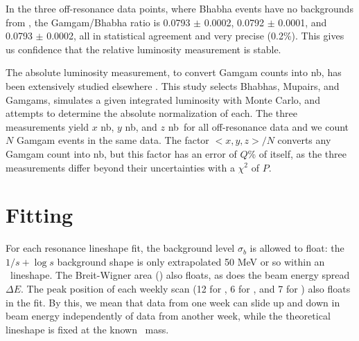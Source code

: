 \documentclass[aps,prd,preprint,superscriptaddress,tightenlines,nofootinbib,floatfix]{revtex4}
\begin{document}
In the three off-resonance data points, where Bhabha events have no
backgrounds from \ups, the Gamgam/Bhabha ratio is 0.0793 $\pm$ 0.0002,
0.0792 $\pm$ 0.0001, and 0.0793 $\pm$ 0.0002, all in statistical
agreement and very precise (0.2\%).  This gives us confidence that the
relative luminosity measurement is stable.

The absolute luminosity measurement, to convert Gamgam counts into
nb\inv, has been extensively studied elsewhere \cite{lumi}.  This
study selects Bhabhas, Mupairs, and Gamgams, simulates a given
integrated luminosity with Monte Carlo, and attempts to determine the
absolute normalization of each.  The three measurements yield $x$
nb\inv, $y$ nb\inv, and $z$ nb\inv\ for all off-resonance data and we
count $N$ Gamgam events in the same data.  The factor $<x,y,z>/N$
converts any Gamgam count into nb\inv, but this factor has an error of
$Q$\% of itself, as the three measurements differ beyond their
uncertainties with a $\chi^2$ of $P$.

%
\section{Fitting}
%

For each resonance lineshape fit, the background level $\sigma_b$ is
allowed to float: the $1/s + \log s$ background shape is only
extrapolated 50 MeV or so within an \ups\ lineshape.  The Breit-Wigner
area (\gee) also floats, as does the beam energy spread $\Delta E$.
The peak position of each weekly scan (12 for \uone, 6 for \utwo, and
7 for \uthree) also floats in the fit.  By this, we mean that data
from one week can slide up and down in beam energy independently of
data from another week, while the theoretical lineshape is fixed at
the known \ups\ mass.
\end{document}
